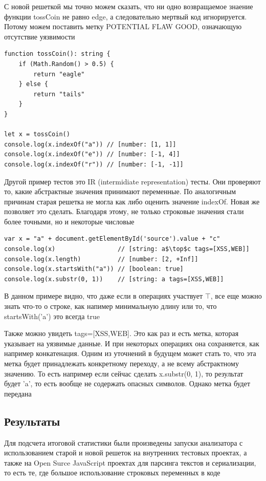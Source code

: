 С новой решеткой мы точно можем сказать, что ни одно возвращаемое знаение функции tossCoin не равно edge, а следовательно мертвый код игнорируется. Потому можем поставить метку POTENTIAL FLAW GOOD, означающую отсутствие уязвимости

\newpage
\begin{lstlisting}[caption={Пример IR тестов}]
function tossCoin(): string {
    if (Math.Random() > 0.5) {
        return "eagle"
    } else {
        return "tails"
    }
}

let x = tossCoin()
console.log(x.indexOf("a")) // [number: [1, 1]]
console.log(x.indexOf("e")) // [number: [-1, 4]]
console.log(x.indexOf("r")) // [number: [-1, -1]]
\end{lstlisting}

Другой пример тестов это IR (intermidiate representation) тесты. Они проверяют то, какие абстрактные значения принимают переменные. По аналогичным причинам старая решетка не могла как либо оценить значение indexOf. Новая же позволяет это сделать. Благодаря этому, не только строковые значения стали более точными, но и некоторые числовые


\begin{lstlisting}[mathescape=true, caption={Еще пример IR тестов}]
var x = "a" + document.getElementById('source').value + "c"
console.log(x)                 // [string: a$\top$c tags=[XSS,WEB]]
console.log(x.length)          // [number: [2, +Inf]]
console.log(x.startsWith("a")) // [boolean: true]
console.log(x.substr(0, 1))    // [string: a tags=[XSS,WEB]]
\end{lstlisting}

В данном примере видно, что даже если в операциях участвует $\top$, все еще можно знать что-то о строке, как напимер минимальную длину или то, что startsWith('a') это всегда true

Также можно увидеть tags=[XSS,WEB]. Это как раз и есть метка, которая указывает на уязвимые данные. И при некоторых операциях она сохраняется, как например конкатенация. Одним из уточнений в будущем может стать то, что эта метка будет принадлежать конкретному переходу, а не всему абстрактному значению. То есть например если сейчас сделать x.substr(0, 1), то результат будет 'a', то есть вообще не содержать опасных символов. Однако метка будет передана


\newpage
\subsection{Результаты}
Для подсчета итоговой статистики были произведены запуски анализатора с использованием старой и новой решеток на внутренних тестовых проектах, а также на Open Surce JavaScript проектах для парсинга текстов и сериализации, то есть те, где большое использование строковых переменных в коде 

